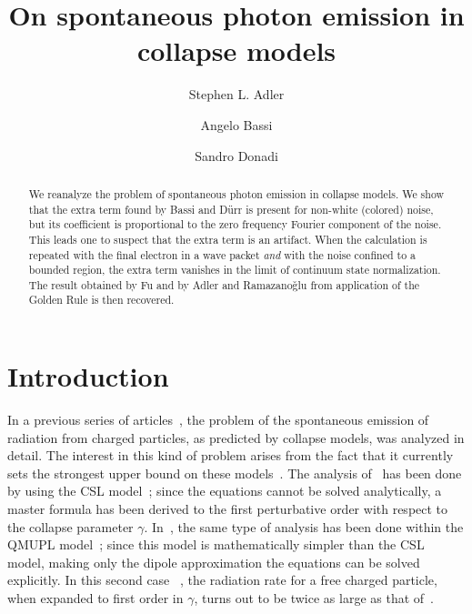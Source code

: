 \documentclass[12pt,onecolumn,amssymb,nofootinbib]{revtex4-2} %
\begin{document}
\title{On spontaneous photon emission in collapse models}

\author{Stephen L. Adler}
 

\author{Angelo Bassi}
  

\author{Sandro Donadi}
  

\begin{abstract}
We reanalyze the problem of spontaneous photon emission in collapse models.  We show
that the extra term found by Bassi and D\"urr is present for non-white (colored)
noise, but its coefficient is proportional to the zero frequency Fourier component
of the noise.  This leads one to suspect that the extra term is an artifact.  When
the calculation is repeated with the final electron in a wave packet {\it and} with the
noise confined to a bounded region, the extra term vanishes in the limit of continuum
state normalization.  The result obtained by Fu and by Adler and Ramazano\v glu from application
of the Golden Rule is then recovered.


\end{abstract}
\maketitle

\section{Introduction}

In a previous series of articles~\cite{ref:fu,ref:ar,ref:bd}, the problem of the spontaneous emission of radiation from charged particles, as predicted by collapse models, was analyzed in detail. The interest in this kind of problem arises from the fact that it currently sets the strongest upper bound on these models~\cite{ref:ap,ref:sci}. The analysis of~\cite{ref:fu,ref:ar} has been done by using the CSL model~\cite{ref:csl}; since the equations cannot be solved analytically, a master formula has been derived to the first perturbative order with respect to the collapse parameter $\gamma$.  In~\cite{ref:bd}, the same type of analysis has been done within the QMUPL model~\cite{ref:qmupl}; since this model is mathematically simpler than the CSL model, making only the dipole approximation the equations can be solved explicitly. In this second case ~\cite{ref:bd}, the radiation rate for a free charged particle, when expanded to first order in $\gamma$, turns out to be twice as large as that of~\cite{ref:fu,ref:ar}.
\end{document}
